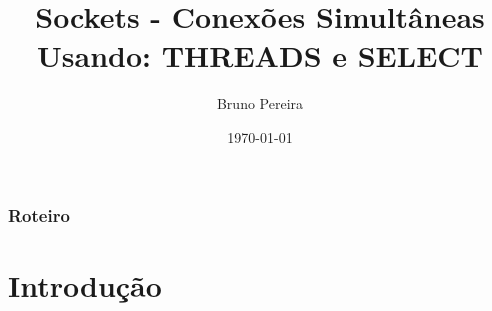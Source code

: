 \documentclass[10pt, xcolor=x11names]{beamer}
\title[Sockets -- Conexões Simultâneas]{Sockets - Conexões Simultâneas \\ Usando: THREADS e SELECT} %
\author[Bruno P. Santos]{Bruno Pereira}%
\institute[ UFMG ]%
{
Universidade Federal de Minas Gerais \\ %
\medskip
\textit{bruno.ps@live.com} %
}
\date{\today} %
\begin{document}
\begin{frame}
\titlepage %
\end{frame}


\begin{frame}
\frametitle{Roteiro} %
\tableofcontents %
\end{frame}


\section{Introdução} %
\end{document}
